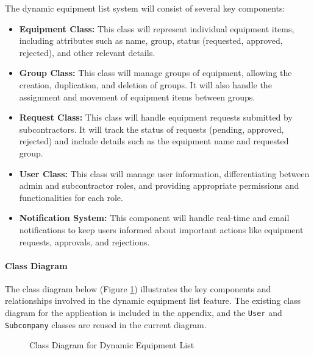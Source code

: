 The dynamic equipment list system will consist of several key components:

\begin{itemize}
    \item \textbf{Equipment Class:} This class will represent individual equipment items, including attributes such as name, group, status (requested, approved, rejected), and other relevant details.
    \item \textbf{Group Class:} This class will manage groups of equipment, allowing the creation, duplication, and deletion of groups. It will also handle the assignment and movement of equipment items between groups.
    \item \textbf{Request Class:} This class will handle equipment requests submitted by subcontractors. It will track the status of requests (pending, approved, rejected) and include details such as the equipment name and requested group.
    \item \textbf{User Class:} This class will manage user information, differentiating between admin and subcontractor roles, and providing appropriate permissions and functionalities for each role.
    \item \textbf{Notification System:} This component will handle real-time and email notifications to keep users informed about important actions like equipment requests, approvals, and rejections.
\end{itemize}
\paragraph{Class Diagram}
The class diagram below (Figure \ref{fig:class_diagram}) illustrates the key components and relationships involved in the dynamic equipment list feature. The existing class diagram for the application is included in the appendix, and the \texttt{User} and \texttt{Subcompany} classes are reused in the current diagram.
\begin{figure}[H]
    \centering
    \caption{Class Diagram for Dynamic Equipment List}
    \label{fig:class_diagram}
\end{figure}

